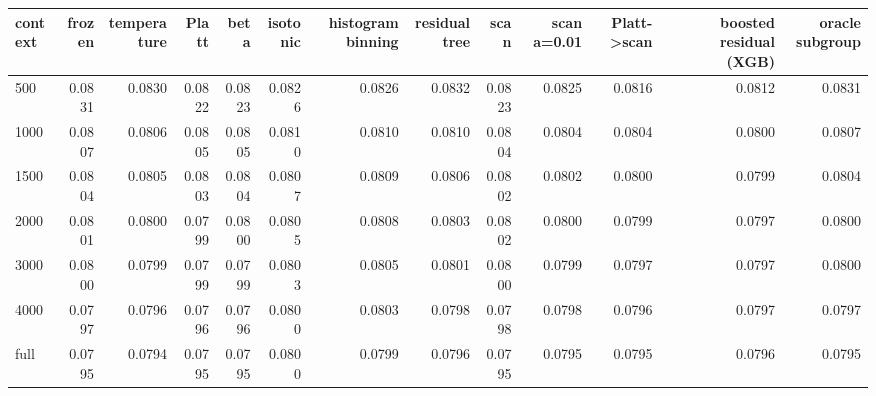 \begin{tabular}{lrrrrrrrrrrrr}
\toprule
context & frozen & temperature & Platt & beta & isotonic & histogram binning & residual tree & scan & scan a=0.01 & Platt->scan & boosted residual (XGB) & oracle subgroup \\
\midrule
500 & 0.0831 & 0.0830 & 0.0822 & 0.0823 & 0.0826 & 0.0826 & 0.0832 & 0.0823 & 0.0825 & 0.0816 & 0.0812 & 0.0831 \\
1000 & 0.0807 & 0.0806 & 0.0805 & 0.0805 & 0.0810 & 0.0810 & 0.0810 & 0.0804 & 0.0804 & 0.0804 & 0.0800 & 0.0807 \\
1500 & 0.0804 & 0.0805 & 0.0803 & 0.0804 & 0.0807 & 0.0809 & 0.0806 & 0.0802 & 0.0802 & 0.0800 & 0.0799 & 0.0804 \\
2000 & 0.0801 & 0.0800 & 0.0799 & 0.0800 & 0.0805 & 0.0808 & 0.0803 & 0.0802 & 0.0800 & 0.0799 & 0.0797 & 0.0800 \\
3000 & 0.0800 & 0.0799 & 0.0799 & 0.0799 & 0.0803 & 0.0805 & 0.0801 & 0.0800 & 0.0799 & 0.0797 & 0.0797 & 0.0800 \\
4000 & 0.0797 & 0.0796 & 0.0796 & 0.0796 & 0.0800 & 0.0803 & 0.0798 & 0.0798 & 0.0798 & 0.0796 & 0.0797 & 0.0797 \\
full & 0.0795 & 0.0794 & 0.0795 & 0.0795 & 0.0800 & 0.0799 & 0.0796 & 0.0795 & 0.0795 & 0.0795 & 0.0796 & 0.0795 \\
\bottomrule
\end{tabular}
